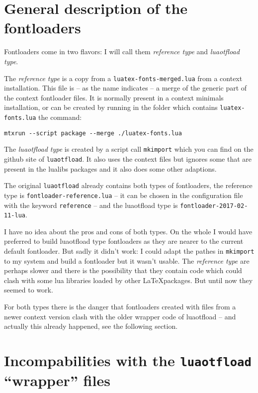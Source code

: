 \documentclass[parskip=half-,egregdoesnotlikesansseriftitles]{scrartcl}
\newcommand\package[1]{\texttt{#1}}
\begin{document}
\section{General description of the fontloaders}

Fontloaders come in two flavors: I will call them \emph{reference type} and \emph{luaotfload type}.

The \emph{reference type} is a copy from a \texttt{luatex-fonts-merged.lua} from a context installation. This file is -- as the name indicates -- a merge of the generic part of the context fontloader files. It is normally present in a context minimals installation, or can be created by running in the folder which contains \texttt{luatex-fonts.lua} the command:

\begin{lstlisting}
mtxrun --script package --merge ./luatex-fonts.lua
\end{lstlisting}

The \emph{luaotfload type} is created by a script call \texttt{mkimport} which you can find on the github site of \package{luaotfload}. It also uses the context files but ignores some that are present in the lualibs packages and it also does some other adaptions.

The original \package{luaotfload} already contains both types of fontloaders, the reference type is \texttt{fontloader-reference.lua} -- it can be chosen in the configuration file with the keyword \texttt{reference} -- and the luaotfload type is \texttt{fontloader-2017-02-11-lua}.

I have no idea about the pros and cons of both types. On the whole I would have preferred to build  luaotfload type fontloaders as they are nearer to the current default fontloader. But sadly it didn't work: I could adapt the pathes in \texttt{mkimport} to my system and build a fontloader but it wasn't usable.
The \emph{reference type} are perhaps slower and there is the possibility that they contain code which could clash with some lua libraries loaded by other \LaTeX packages. But until now they seemed to work.

For both types there is the danger that fontloaders created with files from a newer context version clash with the older wrapper code of luaotfload -- and actually this already happened, see the following section.



\section{Incompabilities with the \package{luaotfload} \enquote{wrapper} files}\label{sec:problem}
\end{document}
